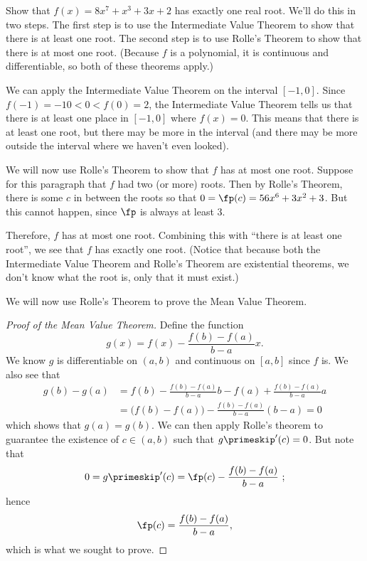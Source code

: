 \begin{example}\label{ex_rolle1}%
Show that $f(x)=8x^7+x^3+3x+2$ has exactly one real root.
\solution
We'll do this in two steps.  The first step is to use the Intermediate Value Theorem to show that there is at least one root.  The second step is to use Rolle's Theorem to show that there is at most one root.  (Because $f$ is a polynomial, it is continuous and differentiable, so both of these theorems apply.)

We can apply the Intermediate Value Theorem on the interval $[-1,0]$.  Since $f(-1)=-10<0<f(0)=2$, the Intermediate Value Theorem tells us that there is at least one place in $[-1,0]$ where $f(x)=0$.  This means that there is at least one root, but there may be more in the interval (and there may be more outside the interval where we haven't even looked).

We will now use Rolle's Theorem to show that $f$ has at most one root. Suppose for this paragraph that $f$ had two (or more) roots. Then by Rolle's Theorem, there is some $c$ in between the roots so that $0=\fp(c)=56x^6+3x^2+3$. But this cannot happen, since $\fp$ is always at least 3.

Therefore, $f$ has at most one root.  Combining this with ``there is at least one root'', we see that $f$ has exactly one root.  (Notice that because both the Intermediate Value Theorem and Rolle's Theorem are existential theorems, we don't know what the root is, only that it must exist.)
\end{example}

We will now use Rolle's Theorem to prove the Mean Value Theorem.

\begin{proof}[Proof of the Mean Value Theorem]
Define the function
\[g(x) = f(x) - \frac{f(b)-f(a)}{b-a}x.\]
We know $g$ is differentiable on $(a,b)$ and  continuous on $[a,b]$ since $f$ is.  We also see that
\begin{align*}
g(b)-g(a)&=f(b)-\frac{f(b)-f(a)}{b-a}b-f(a)+\frac{f(b)-f(a)}{b-a}a\\
&=\bigl(f(b)-f(a)\bigr)-\frac{f(b)-f(a)}{b-a}(b-a)=0
\end{align*}
which shows that $g(a)=g(b)$. We can then apply Rolle's theorem to guarantee the existence of $c \in (a,b)$ such that $g\primeskip'(c) = 0$.  But note that
\[0= g\primeskip'(c) = \fp(c) - \frac{f(b)-f(a)}{b-a} \ ;\]
hence
\[\fp(c) = \frac{f(b)-f(a)}{b-a},\]
which is what we sought to prove.
\end{proof}

